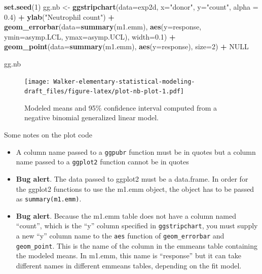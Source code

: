 \documentclass[]{book}
\newenvironment{Shaded}{\begin{snugshade}}{\end{snugshade}}
\newcommand{\DataTypeTok}[1]{\textcolor[rgb]{0.13,0.29,0.53}{#1}}
\newcommand{\DecValTok}[1]{\textcolor[rgb]{0.00,0.00,0.81}{#1}}
\newcommand{\FloatTok}[1]{\textcolor[rgb]{0.00,0.00,0.81}{#1}}
\newcommand{\KeywordTok}[1]{\textcolor[rgb]{0.13,0.29,0.53}{\textbf{#1}}}
\newcommand{\NormalTok}[1]{#1}
\newcommand{\OperatorTok}[1]{\textcolor[rgb]{0.81,0.36,0.00}{\textbf{#1}}}
\newcommand{\OtherTok}[1]{\textcolor[rgb]{0.56,0.35,0.01}{#1}}
\newcommand{\StringTok}[1]{\textcolor[rgb]{0.31,0.60,0.02}{#1}}
\providecommand{\tightlist}{%
  \setlength{\itemsep}{0pt}\setlength{\parskip}{0pt}}
\begin{document}
\begin{Shaded}
\begin{Highlighting}[]
\KeywordTok{set.seed}\NormalTok{(}\DecValTok{1}\NormalTok{)}
\NormalTok{gg.nb <-}\StringTok{ }\KeywordTok{ggstripchart}\NormalTok{(}\DataTypeTok{data=}\NormalTok{exp2d,}
                 \DataTypeTok{x=}\StringTok{"donor"}\NormalTok{, }
                 \DataTypeTok{y=}\StringTok{"count"}\NormalTok{,}
                 \DataTypeTok{alpha =} \FloatTok{0.4}\NormalTok{) }\OperatorTok{+}
\StringTok{  }\KeywordTok{ylab}\NormalTok{(}\StringTok{"Neutrophil count"}\NormalTok{) }\OperatorTok{+}
\StringTok{  }\KeywordTok{geom_errorbar}\NormalTok{(}\DataTypeTok{data=}\KeywordTok{summary}\NormalTok{(m1.emm), }
                \KeywordTok{aes}\NormalTok{(}\DataTypeTok{y=}\NormalTok{response,}
                    \DataTypeTok{ymin=}\NormalTok{asymp.LCL, }
                    \DataTypeTok{ymax=}\NormalTok{asymp.UCL), }
                \DataTypeTok{width=}\FloatTok{0.1}\NormalTok{) }\OperatorTok{+}
\StringTok{  }\KeywordTok{geom_point}\NormalTok{(}\DataTypeTok{data=}\KeywordTok{summary}\NormalTok{(m1.emm), }
                \KeywordTok{aes}\NormalTok{(}\DataTypeTok{y=}\NormalTok{response), }
                \DataTypeTok{size=}\DecValTok{2}\NormalTok{) }\OperatorTok{+}
\StringTok{  }\OtherTok{NULL}

\NormalTok{gg.nb}
\end{Highlighting}
\end{Shaded}

\begin{figure}
\centering
\texttt{[image: Walker-elementary-statistical-modeling-draft\_files/figure-latex/plot-nb-plot-1.pdf]}
\caption{\label{fig:plot-nb-plot}Modeled means and 95\% confidence interval computed from a negative binomial generalized linear model.}
\end{figure}

Some notes on the plot code

\begin{itemize}
\tightlist
\item
  A column name passed to a \texttt{ggpubr} function must be in quotes but a column name passed to a \texttt{ggplot2} function cannot be in quotes
\item
  \textbf{Bug alert}. The data passed to ggplot2 must be a data.frame. In order for the ggplot2 functions to use the m1.emm object, the object has to be passed as \texttt{summary(m1.emm)}.
\item
  \textbf{Bug alert}. Because the m1.emm table does not have a column named ``count'', which is the ``y'' column specified in \texttt{ggstripchart}, you must supply a new ``y'' column name to the \texttt{aes} function of \texttt{geom\_errorbar} and \texttt{geom\_point}. This is the name of the column in the emmeans table containing the modeled means. In m1.emm, this name is ``response'' but it can take different names in different emmeans tables, depending on the fit model.
\end{itemize}
\end{document}
